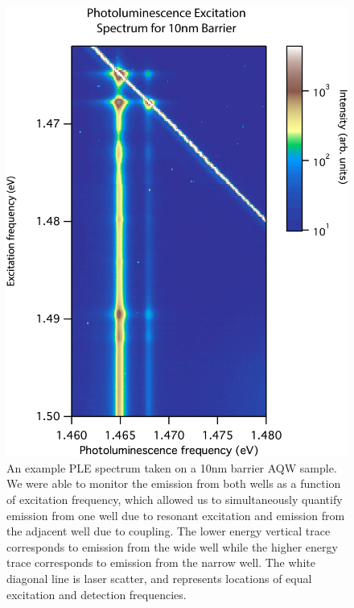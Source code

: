 \begin{figure}
\centering
\includegraphics[width = .8\textwidth]{Layout5.jpg}
\caption{ \doublespacing An example PLE spectrum taken on a 10nm barrier AQW sample. We were able to monitor the emission from both wells as a function of excitation frequency, which allowed us to simultaneously quantify emission from one well due to resonant excitation and emission from the adjacent well due to coupling. The lower energy vertical trace corresponds to emission from the wide well while the higher energy trace corresponds to emission from the narrow well. The white diagonal line is laser scatter, and represents locations of equal excitation and detection frequencies.}
\label{scan}
\end{figure}

